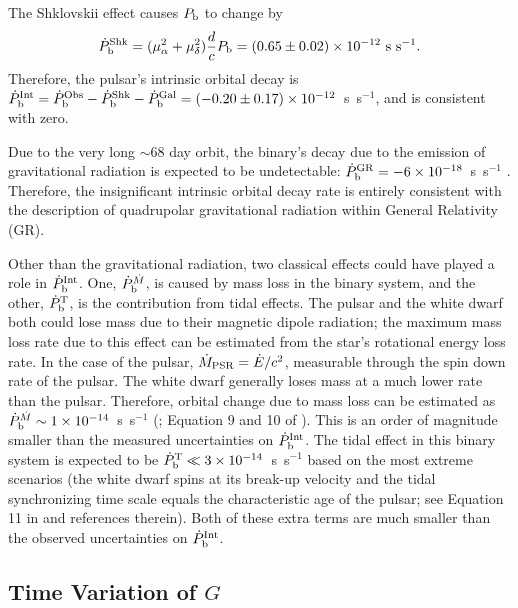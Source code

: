 The Shklovskii effect causes $P_{\rm b}$ to
change by
\begin{equation}
\dot{P}_{\rm b}^{\rm Shk} = (\mu_{\alpha}^2+\mu_{\delta}^2)\frac{d}{c}P_{\rm
b} = (0.65\pm0.02)\times10^{-12}~{\rm s~s^{-1}}.
\end{equation}
Therefore, the pulsar's intrinsic orbital decay is $\dot{P}_{\rm b}^{\rm Int}
= \dot{P}_{\rm b}^{\rm Obs} - \dot{P}_{\rm b}^{\rm Shk} - \dot{P}_{\rm b}^{\rm
Gal} = (-0.20\pm0.17)\times10^{-12}$~s~s$^{-1}$, and is consistent with zero.

Due to the very long $\sim$68 day orbit, the binary's decay due to the
emission of gravitational
radiation is expected to be undetectable: $\dot{P}_{\rm b}^{\rm GR} =
-6\times10^{-18}$~s~s$^{-1}$ \citep{lk05}.  Therefore, the insignificant
intrinsic orbital decay rate is entirely consistent with the
description of quadrupolar gravitational radiation within General
Relativity (GR).

Other than the gravitational radiation, two classical effects could have played a role in
$\dot{P}_{\rm b}^{\rm Int}$. One, $\dot{P}_{\rm b}^{\dot{M}}$, is caused by mass loss in the
binary system, and the other, $\dot{P}_{\rm b}^{\rm T}$, is the contribution
from tidal effects.
The pulsar and the white dwarf both could lose mass due to their magnetic dipole radiation; the maximum
mass loss rate due to this effect can be estimated from the
star's rotational energy loss rate. In the case of the pulsar, $\dot{M}_{\rm
PSR}=\dot{E}/c^2$, measurable through the spin down rate of the pulsar.
The white dwarf generally loses mass at a much lower rate than the pulsar.
Therefore, orbital change due to mass loss can be estimated as $\dot{P}_{\rm
b}^{\dot{M}}\sim 1\times10^{-14}$~s~s$^{-1}$ (\citealt{dt91}; Equation 9 and 10
of \citealt{fwe+12}). This is an order of magnitude smaller than the measured
uncertainties on $\dot{P}_{\rm b}^{\rm Int}$.
The tidal effect in this binary system is expected to be $\dot{P}_{\rm b}^{\rm
T}\ll3\times10^{-14}$~s~s$^{-1}$ based on the most extreme scenarios (the white
dwarf spins at its break-up velocity and the tidal synchronizing time scale equals the
characteristic age of the pulsar; see Equation 11 in \citealt{fwe+12} and
references therein).
Both of these extra terms are much smaller than the observed uncertainties
on $\dot{P}_{\rm b}^{\rm Int}$.


\subsection{Time Variation of $G$}
\label{sec:Gdot}


